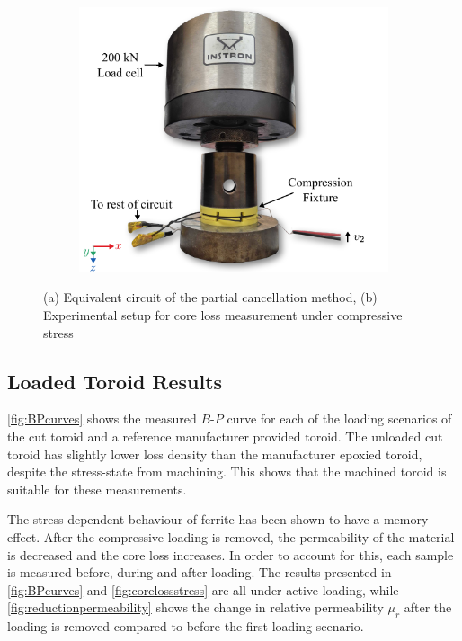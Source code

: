 \documentclass[conference]{IEEEtran}
\begin{document}
\begin{figure}[t]
  \begin{subfigure}{\columnwidth}
    \centering
    
    \caption{}
    \label{fig:partialcancellationcircuit}
  \end{subfigure}

  \vspace{1em}

  \begin{subfigure}{\columnwidth}
    \centering
    \includegraphics{figures/experimentalsetup.pdf}
    \caption{}
    \label{fig:experimentalsetup}
  \end{subfigure}
  \caption{(a) Equivalent circuit of the partial cancellation method, (b) Experimental setup for core loss measurement under compressive stress}
\end{figure}
\subsection{Loaded Toroid Results}

\cref{fig:BPcurves} shows the measured $B$-$P$ curve for each of the loading scenarios of the cut toroid and a reference manufacturer provided toroid. 
The unloaded cut toroid has slightly lower loss density than the manufacturer epoxied toroid, despite the stress-state from machining. 
This shows that the machined toroid is suitable for these measurements. 

The stress-dependent behaviour of ferrite has been shown to have a memory effect. 
After the compressive loading is removed, the permeability of the material is decreased and the core loss increases. 
In order to account for this, each sample is measured before, during and after loading. 
The results presented in \cref{fig:BPcurves} and \cref{fig:corelossstress} are all under active loading, while \cref{fig:reductionpermeability} shows the change in relative permeability $\mu_r$ after the loading is removed compared to before the first loading scenario. 
\end{document}
